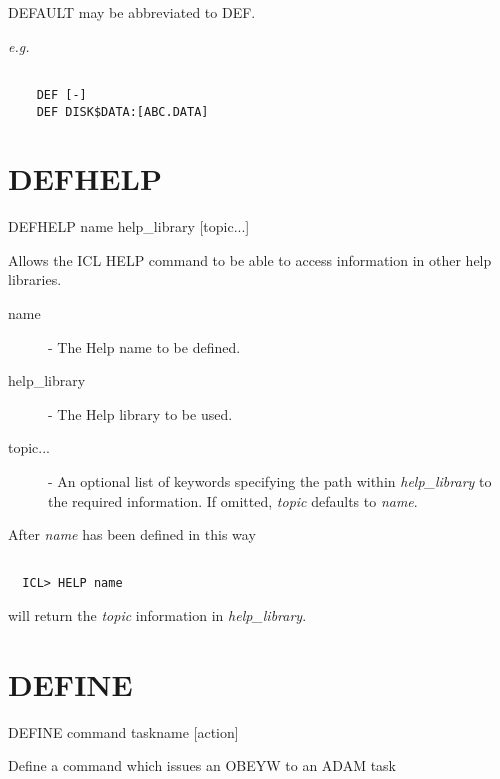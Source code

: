  DEFAULT may be abbreviated to DEF.

{\em e.g.}
\begin{verbatim}

    DEF [-]
    DEF DISK$DATA:[ABC.DATA]

\end{verbatim}

\section{DEFHELP}

   DEFHELP \hspace{.5cm} name \hspace{.5cm} help\_library \hspace{.5cm} 
[topic...]

 Allows the ICL HELP command to be able to access information in other 
 help libraries.

\begin{description}

 \item[name] - The Help name to be defined.

 \item[help\_library] - The Help library to be used.

 \item[topic...] - An optional list of keywords specifying the path within
{\em help\_library} to the required information. If omitted, {\em topic} 
defaults to {\em name}.

\end{description}

After {\em name} has been defined in this way
\begin{verbatim}

  ICL> HELP name

\end{verbatim}
will return the {\em topic}  information in {\em help\_library}.

\section{DEFINE}

   DEFINE \hspace{.5cm} command \hspace{.5cm} taskname \hspace{.5cm} [action]

 Define a command which issues an OBEYW to an ADAM task

